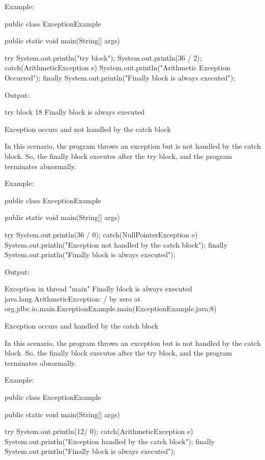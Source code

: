{ 

Example:
 

public class ExceptionExample {

	public static void main(String[] args) {
		
		try {
			System.out.println("try block");
			System.out.println(36 / 2);
		}
		catch(ArithmeticException e) {
			System.out.println("Arithmetic Exception Occurred");
		}
		finally {
			System.out.println("Finally block is always executed");
		}
	}
}
 

Output:
 

try block
18
Finally block is always executed
 

 

Exception occurs and not handled by the catch block
 

In this scenario, the program throws an exception but is not handled by the catch block. So, the finally block executes after the try block, and the program terminates abnormally.

 

Example:
 

public class ExceptionExample {

	public static void main(String[] args) {
		
		try {
			System.out.println(36 / 0);
		}
		catch(NullPointerException e) {
			System.out.println("Exception not handled by the catch block");
		}
		finally {
			System.out.println("Finally block is always executed");
		}
	}
}
 

Output:
 

Exception in thread "main" Finally block is always executed
java.lang.ArithmeticException: / by zero
	at org.jdbc.io.main.ExceptionExample.main(ExceptionExample.java:8)
 

 

Exception occurs and handled by the catch block
 

In this scenario, the program throws an exception but is not handled by the catch block. So, the finally block executes after the try block, and the program terminates abnormally.

 

Example:
 

public class ExceptionExample {

	public static void main(String[] args) {
		
		try {
			System.out.println(12/ 0);
		}
		catch(ArithmeticException e) {
			System.out.println("Exception handled by the catch block");
		}
		finally {
			System.out.println("Finally block is always executed");
		}
	}
}
 

}
